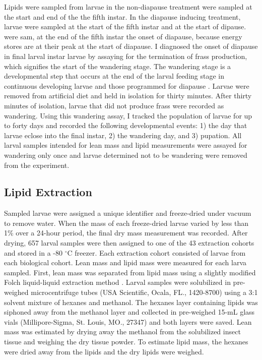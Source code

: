 \documentclass[review]{elsarticle}
\begin{document}
Lipids were sampled from larvae in the non-diapause treatment were sampled at the start and end of the the fifth instar. In the diapause inducing treatment, larvae were sampled at the start of the fifth instar and at the start of dipause. were sam, at the end of the fifth instar  the onset of diapause, because energy stores are at their peak at the start of diapause. I diagnosed the onset of diapause in final larval instar larvae by assaying for the termination of frass production, which signifies the start of the wandering stage. The wandering stage is a developmental step that occurs at the end of the larval feeding stage in continuous developing larvae and those programmed for diapause \citep{Sakurai1998}. Larvae were removed from artificial diet and held in isolation for thirty minutes. After thirty minutes of isolation, larvae that did not produce frass were recorded as wandering. Using this wandering assay, I tracked the population of larvae for up to forty days and recorded the following developmental events: 1) the day that larvae eclose into the final instar, 2) the wandering day, and 3) pupation. All larval samples intended for lean mass and lipid measurements were assayed for wandering only once and larvae determined not to be wandering were removed from the experiment. 
\subsection{Lipid Extraction}
Sampled larvae were assigned a unique identifier and freeze-dried under vacuum to remove water. When the mass of each freeze-dried larvae varied by less than 1\% over a 24-hour period, the final dry mass measurement was recorded. After drying, 657 larval samples were then assigned to one of the 43 extraction cohorts and stored in a -80 $^\circ$C freezer. Each extraction cohort consisted of larvae from each biological cohort. Lean mass and lipid mass were measured for each larva sampled. First, lean mass was separated from lipid mass using a slightly modified Folch liquid-liquid extraction method \citep{FOLCH1957}. Larval samples were solubilized in pre-weighed microcentrifuge tubes (USA Scientific, Ocala, FL., 1420-8700) using a 3:1 solvent mixture of hexanes and methanol. The hexanes layer containing lipids was siphoned away from the methanol layer and collected in pre-weighed 15-mL glass vials (Millipore-Sigma, St. Louis, MO., 27347) and both layers were saved. Lean mass was estimated by drying away the methanol from the solubilized insect tissue and weighing the dry tissue powder. To estimate lipid mass, the hexanes were dried away from the lipids and the dry lipids were weighed. 
\end{document}
